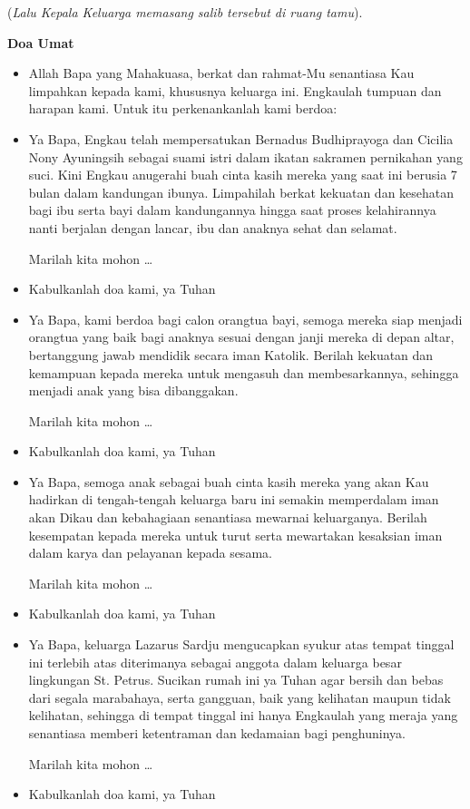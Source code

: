 \documentclass[12pt,twoside]{book}
\makeatletter
\newcommand{\subjudul}[1]{%
  {\parindent \z@ \normalfont
    \interlinepenalty\@M \bfseries #1\par\nobreak \vskip 20\p@ }}
\newcommand{\BU}[1]{\begin{itemize} \item[U:] #1 \end{itemize}}
\newcommand{\BI}[1]{\begin{itemize} \item[I:] #1 \end{itemize}}
\newcommand{\BP}[1]{\begin{itemize} \item[P:] #1 \end{itemize}}
\newcommand{\keluarga}{Lazarus Sardju\xspace}
\makeatother
\begin{document}
(\textit{Lalu Kepala Keluarga memasang salib tersebut di ruang tamu}).

\subjudul{Doa Umat}
\BI{Allah Bapa yang Mahakuasa, berkat dan rahmat-Mu senantiasa Kau limpahkan kepada kami, khususnya keluarga ini. Engkaulah tumpuan dan harapan kami. Untuk itu perkenankanlah kami berdoa:}

\BP{Ya Bapa, Engkau telah mempersatukan Bernadus Budhiprayoga dan Cicilia Nony Ayuningsih sebagai suami istri dalam ikatan sakramen pernikahan yang suci. Kini Engkau anugerahi buah cinta kasih mereka yang saat ini berusia 7 bulan dalam kandungan ibunya. Limpahilah berkat kekuatan dan kesehatan bagi ibu serta bayi dalam kandungannya hingga saat proses kelahirannya nanti berjalan dengan lancar, ibu dan anaknya sehat dan selamat.

Marilah kita mohon \ldots}

\BU{Kabulkanlah doa kami, ya Tuhan}

\BP{Ya Bapa, kami berdoa bagi calon orangtua bayi, semoga mereka siap menjadi orangtua yang baik bagi anaknya sesuai dengan janji mereka di depan altar, bertanggung jawab mendidik secara iman Katolik. Berilah kekuatan dan kemampuan kepada mereka untuk mengasuh dan membesarkannya, sehingga menjadi anak yang bisa dibanggakan.

Marilah kita mohon \ldots}

\BU{Kabulkanlah doa kami, ya Tuhan}

\BP{Ya Bapa, semoga anak sebagai buah cinta kasih mereka yang akan Kau hadirkan di tengah-tengah keluarga baru ini semakin memperdalam iman akan Dikau dan kebahagiaan senantiasa mewarnai keluarganya. Berilah kesempatan kepada mereka untuk turut serta mewartakan kesaksian iman dalam karya dan pelayanan kepada sesama.

Marilah kita mohon \ldots}

\BU{Kabulkanlah doa kami, ya Tuhan}

\BP{Ya Bapa, keluarga \keluarga mengucapkan syukur atas tempat tinggal ini terlebih atas diterimanya sebagai anggota dalam keluarga besar lingkungan St. Petrus. Sucikan rumah ini ya Tuhan agar bersih dan bebas dari segala marabahaya, serta gangguan, baik yang kelihatan maupun tidak kelihatan, sehingga di tempat tinggal ini hanya Engkaulah yang meraja yang senantiasa memberi ketentraman dan kedamaian bagi penghuninya.  

Marilah kita mohon \ldots}

\BU{Kabulkanlah doa kami, ya Tuhan}
\end{document}
